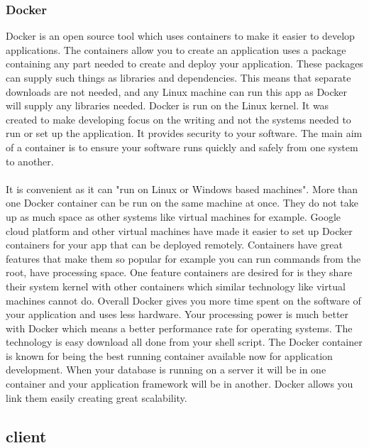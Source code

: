 \subsubsection{Docker}
Docker is an open source tool which uses containers to make it easier to develop applications.\cite{DockerCont} The containers allow you to create an application uses a package containing any part needed to create and deploy your application. These packages can supply such things as libraries and dependencies. This means that separate downloads are not needed, and any Linux machine can run this app as Docker will supply any libraries needed. Docker is run on the Linux kernel. It was created to make developing focus on the writing and not the systems needed to run or set up the application. It provides security to your software. The main aim of a container is to ensure your software runs quickly and safely from one system to another. \paragraph{}It is convenient as it can "run on Linux or Windows based machines".\cite{Container} More than one Docker container can be run on the same machine at once. They do not take up as much space as other systems like virtual machines for example. Google cloud platform and other virtual machines have made it easier to set up Docker containers for your app that can be deployed remotely.\cite{DockerVsVm} Containers have great features that make them so popular for example you can run commands from the root, have processing space.\cite{DockerVsVm} One feature containers are desired for is they share their system kernel with other containers which similar technology like virtual machines cannot do. Overall Docker gives you more time spent on the software of your application and uses less hardware. Your processing power is much better with Docker which means a better performance rate for operating systems. The technology is easy download all done from your shell script. The Docker container is known for being the best running container available now for application development. When your database is running on a server it will be in one container and your application framework will be in another. Docker allows you link them easily creating great scalability. 

\subsection{client}

